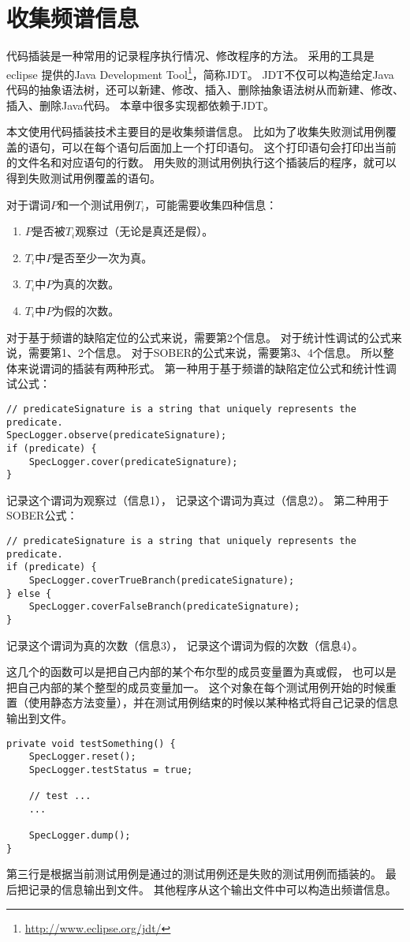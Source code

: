 \section{收集频谱信息}

代码插装是一种常用的记录程序执行情况、修改程序的方法。
采用的工具是 eclipse 提供的Java Development Tool\footnote{\url{http://www.eclipse.org/jdt/}}，简称JDT。
JDT不仅可以构造给定Java代码的抽象语法树，还可以新建、修改、插入、删除抽象语法树从而新建、修改、插入、删除Java代码。
本章中很多实现都依赖于JDT。

本文使用代码插装技术主要目的是收集频谱信息。
比如为了收集失败测试用例覆盖的语句，可以在每个语句后面加上一个打印语句。
这个打印语句会打印出当前的文件名和对应语句的行数。
用失败的测试用例执行这个插装后的程序，就可以得到失败测试用例覆盖的语句。

对于谓词$P$和一个测试用例$T_i$，可能需要收集四种信息：
\begin{enumerate}
\item $P$是否被$T_i$观察过（无论是真还是假）。
\item $T_i$中$P$是否至少一次为真。
\item $T_i$中$P$为真的次数。
\item $T_i$中$P$为假的次数。
\end{enumerate}

对于基于频谱的缺陷定位的公式来说，需要第2个信息。
对于统计性调试的公式来说，需要第1、2个信息。
对于SOBER的公式来说，需要第3、4个信息。
所以整体来说谓词的插装有两种形式。
第一种用于基于频谱的缺陷定位公式和统计性调试公式：
\lstset{language=Java}
\begin{lstlisting}
// predicateSignature is a string that uniquely represents the predicate.
SpecLogger.observe(predicateSignature);
if (predicate) {
    SpecLogger.cover(predicateSignature);
}
\end{lstlisting}
记录这个谓词为观察过（信息1），
记录这个谓词为真过（信息2）。
第二种用于SOBER公式：
\lstset{language=Java}
\begin{lstlisting}
// predicateSignature is a string that uniquely represents the predicate.
if (predicate) {
    SpecLogger.coverTrueBranch(predicateSignature);
} else {
    SpecLogger.coverFalseBranch(predicateSignature);
}
\end{lstlisting}
记录这个谓词为真的次数（信息3），
记录这个谓词为假的次数（信息4）。

这几个的函数可以是把自己内部的某个布尔型的成员变量置为真或假，
也可以是把自己内部的某个整型的成员变量加一。
这个对象在每个测试用例开始的时候重置（使用静态方法变量），并在测试用例结束的时候以某种格式将自己记录的信息输出到文件。
\lstset{language=Java}
\begin{lstlisting}
private void testSomething() {
    SpecLogger.reset();
    SpecLogger.testStatus = true;

    // test ...
    ...

    SpecLogger.dump();
}
\end{lstlisting}
第三行是根据当前测试用例是通过的测试用例还是失败的测试用例而插装的。
最后把记录的信息输出到文件。
其他程序从这个输出文件中可以构造出频谱信息。

